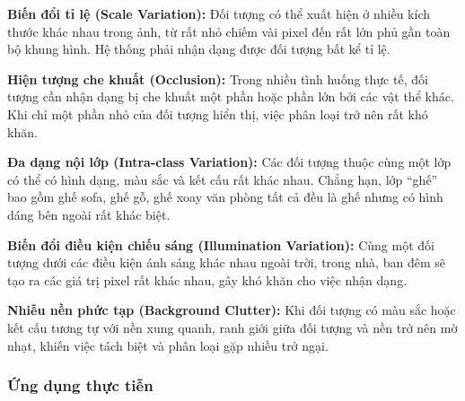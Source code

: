 \documentclass[
]{article}
\begin{document}
\textbf{Biến đổi tỉ lệ (Scale Variation):} Đối tượng có thể xuất hiện ở
nhiều kích thước khác nhau trong ảnh, từ rất nhỏ chiếm vài pixel đến rất
lớn phủ gần toàn bộ khung hình. Hệ thống phải nhận dạng được đối tượng
bất kể tỉ lệ.

\textbf{Hiện tượng che khuất (Occlusion):} Trong nhiều tình huống thực
tế, đối tượng cần nhận dạng bị che khuất một phần hoặc phần lớn bởi các
vật thể khác. Khi chỉ một phần nhỏ của đối tượng hiển thị, việc phân
loại trở nên rất khó khăn.

\textbf{Đa dạng nội lớp (Intra-class Variation):} Các đối tượng thuộc
cùng một lớp có thể có hình dạng, màu sắc và kết cấu rất khác nhau.
Chẳng hạn, lớp ``ghế'' bao gồm ghế sofa, ghế gỗ, ghế xoay văn phòng tất
cả đều là ghế nhưng có hình dáng bên ngoài rất khác biệt.

\textbf{Biến đổi điều kiện chiếu sáng (Illumination Variation):} Cùng
một đối tượng dưới các điều kiện ánh sáng khác nhau ngoài trời, trong
nhà, ban đêm sẽ tạo ra các giá trị pixel rất khác nhau, gây khó khăn cho
việc nhận dạng.

\textbf{Nhiễu nền phức tạp (Background Clutter):} Khi đối tượng có màu
sắc hoặc kết cấu tương tự với nền xung quanh, ranh giới giữa đối tượng
và nền trở nên mờ nhạt, khiến việc tách biệt và phân loại gặp nhiều trở
ngại.

\hypertarget{ux1ee9ng-dux1ee5ng-thux1ef1c-tiux1ec5n}{%
\subsubsection{Ứng dụng thực
tiễn}\label{ux1ee9ng-dux1ee5ng-thux1ef1c-tiux1ec5n}}
\end{document}
